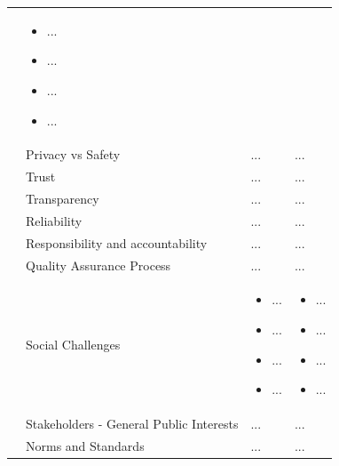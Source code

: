 \begin{table}
\begin{small}
\begin{supertabular}{>{}p{.02\textwidth}|>{\raggedright}p{.105\textwidth}>{\raggedright}p{.4\textwidth}>{\raggedright}p{.4\textwidth}}
\begin{itemize}
					\end{itemize}					  & 
					\begin{itemize}
					\item ...
					\item ...
					\item ...
					\item ...
					\end{itemize}										 
 			 \tabularnewline {}
			& Privacy vs Safety & ...  & ...  
 			 \tabularnewline {}
			& Trust & ...  & ... 
 			 \tabularnewline {}
			& Transparency & ...  & ...  
 			 \tabularnewline {}
			& Reliability & ...  & ...  
 			 \tabularnewline {}
			& Responsibility and accountability & ...  & ...  
 			 \tabularnewline {}
			& Quality Assurance Process & ...  & ...  
			\tabularnewline {}
			 &Social Challenges & 
					\begin{itemize}
					\item ...
					\item ...
					\item ...
					\item ...
					\end{itemize}
 			& 	
					\begin{itemize}
					\item ...
					\item ...
					\item ...
					\item ...
					\end{itemize} 
			\tabularnewline {}
			& Stakeholders - General Public Interests & ...  & ...  
 			 \tabularnewline {}
			& Norms and Standards & ...  & ...  
 			 \tabularnewline 			 																							
			\bottomrule
		\end{supertabular}
	\end{small}
	
\end{table}


